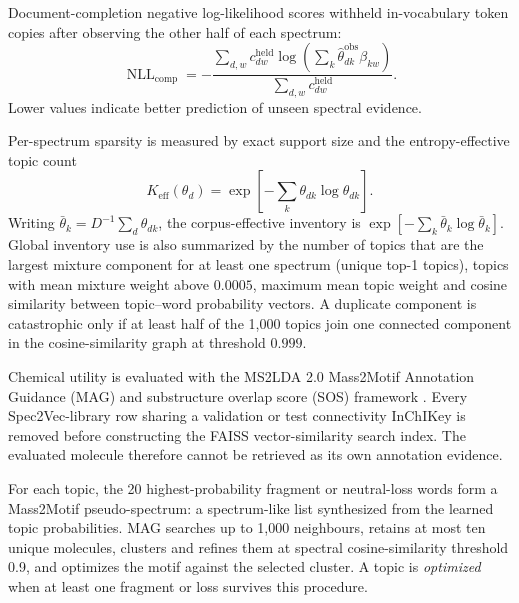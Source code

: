 \documentclass[10pt,a4paper]{article}
\begin{document}
Document-completion negative log-likelihood scores withheld in-vocabulary token
copies after observing the other half of each spectrum:
\begin{equation}
  \operatorname{NLL}_{\mathrm{comp}}
  =-\frac{\sum_{d,w}c^{\mathrm{held}}_{dw}
  \log\left(\sum_k\widehat\theta^{\mathrm{obs}}_{dk}\beta_{kw}\right)}
  {\sum_{d,w}c^{\mathrm{held}}_{dw}}.
  \label{eq:completion-nll}
\end{equation}
Lower values indicate better prediction of unseen spectral evidence.

Per-spectrum sparsity is measured by exact support size and the
entropy-effective topic count
\begin{equation}
  K_{\mathrm{eff}}(\theta_d)=
  \exp\left[-\sum_k\theta_{dk}\log\theta_{dk}\right].
\end{equation}
Writing $\bar\theta_k=D^{-1}\sum_d\theta_{dk}$, the corpus-effective inventory is
$\exp[-\sum_k\bar\theta_k\log\bar\theta_k]$. Global inventory use is also
summarized by the number of topics that are the largest mixture component for
at least one spectrum (unique top-1 topics), topics with mean mixture weight
above $0.0005$, maximum mean topic weight and cosine similarity between
topic--word probability vectors. A duplicate component is catastrophic only if
at least half of the 1,000 topics join one connected component in the
cosine-similarity graph at threshold $0.999$.

Chemical utility is evaluated with the MS2LDA 2.0 Mass2Motif Annotation
Guidance (MAG) and substructure overlap score (SOS) framework
\cite{torresortega2026}. Every Spec2Vec-library row sharing a validation or test
connectivity InChIKey is removed before constructing the FAISS
vector-similarity search index. The evaluated molecule therefore cannot be
retrieved as its own annotation evidence.

For each topic, the 20 highest-probability fragment or neutral-loss words form a
Mass2Motif pseudo-spectrum: a spectrum-like list synthesized from the learned
topic probabilities. MAG searches up to 1,000 neighbours, retains at most ten
unique molecules, clusters and refines them at spectral cosine-similarity
threshold 0.9, and optimizes the motif against the selected cluster. A topic is
\emph{optimized} when at least one fragment or loss survives this procedure.
\end{document}
